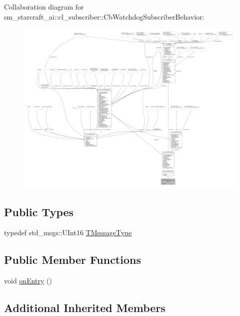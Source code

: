 Collaboration diagram for sm\+\_\+starcraft\+\_\+ai\+:\+:cl\+\_\+subscriber\+:\+:Cb\+Watchdog\+Subscriber\+Behavior\+:
\nopagebreak
\begin{figure}[H]
\begin{center}
\leavevmode
\includegraphics[width=350pt]{classsm__starcraft__ai_1_1cl__subscriber_1_1CbWatchdogSubscriberBehavior__coll__graph}
\end{center}
\end{figure}
\subsection*{Public Types}
\begin{DoxyCompactItemize}
\item 
typedef std\+\_\+msgs\+::\+U\+Int16 \hyperlink{classsm__starcraft__ai_1_1cl__subscriber_1_1CbWatchdogSubscriberBehavior_a0257cda4ee2d761bd71bbbdf8255be70}{T\+Message\+Type}
\end{DoxyCompactItemize}
\subsection*{Public Member Functions}
\begin{DoxyCompactItemize}
\item 
void \hyperlink{classsm__starcraft__ai_1_1cl__subscriber_1_1CbWatchdogSubscriberBehavior_a74aa8ecc420589bda47b90877bc120a7}{on\+Entry} ()
\end{DoxyCompactItemize}
\subsection*{Additional Inherited Members}


